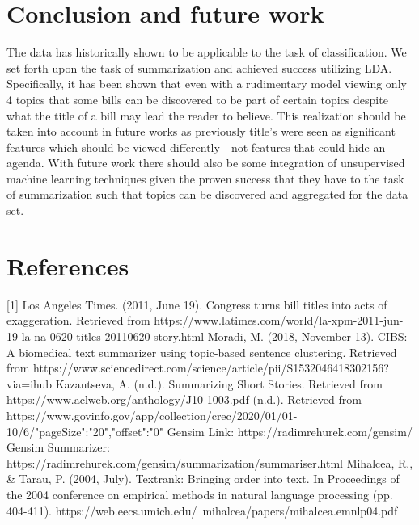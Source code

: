 \documentclass[11pt,a4paper]{article}
\begin{document}
\section{Conclusion and future work}
The data has historically shown to be applicable to the task of classification. We set forth upon the task of summarization and achieved success utilizing LDA. Specifically, it has been shown that even with a rudimentary model viewing only 4 topics that some bills can be discovered to be part of certain topics despite what the title of a bill may lead the reader to believe. This realization should be taken into account in future works as previously title's were seen as significant features which should be viewed differently - not features that could hide an agenda. With future work there should also be some integration of unsupervised machine learning techniques given the proven success that they have to the task of summarization such that topics can be discovered and aggregated for the data set.
  
  

\clearpage
\section{References}

[1] Los Angeles Times. (2011, June 19). Congress turns bill titles into acts of exaggeration. Retrieved from https://www.latimes.com/world/la-xpm-2011-jun-19-la-na-0620-titles-20110620-story.html 
\newline
\newline
[2] Moradi, M. (2018, November 13). CIBS: A biomedical text summarizer using topic-based sentence clustering. Retrieved from https://www.sciencedirect.com/science/article/pii/S1532046418302156?via=ihub 
\newline
\newline
[3]Kazantseva, A. (n.d.). Summarizing Short Stories. Retrieved from https://www.aclweb.org/anthology/J10-1003.pdf 
\newline
\newline
[4] (n.d.). Retrieved from https://www.govinfo.gov/app/collection/crec/2020/01/01-10/6/{"pageSize":"20","offset":"0"} 
\newline
\newline
[5] Gensim Link:
https://radimrehurek.com/gensim/
\newline
\newline
[6] Gensim Summarizer:
https://radimrehurek.com/gensim/summarization/summariser.html
\newline
\newline
[7] Mihalcea, R., & Tarau, P. (2004, July). Textrank: Bringing order into text. In Proceedings of the 2004 conference on empirical methods in natural language processing (pp. 404-411).
https://web.eecs.umich.edu/~mihalcea/papers/mihalcea.emnlp04.pdf 
\end{document}
